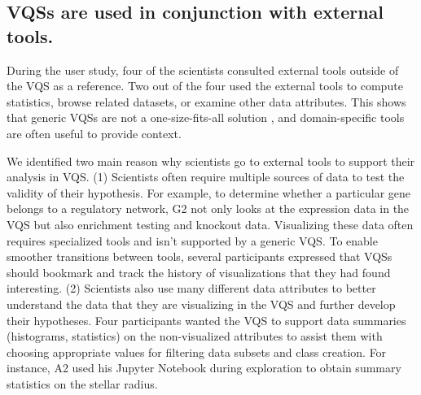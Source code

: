 \subsection{VQSs are used in conjunction with external tools.}
\par During the user study, four of the scientists consulted external tools outside of the VQS as a reference. Two out of the four used the external tools to compute statistics, browse related datasets, or examine other data attributes. This shows that generic VQSs are not a one-size-fits-all solution%
, and domain-specific tools are often useful to provide context.
\par We identified two main reason why scientists go to external tools to support their analysis in VQS. (1) Scientists often require multiple sources of data to test the validity of their hypothesis. For example, to determine whether a particular gene belongs to a regulatory network, G2 not only looks at the expression data in the VQS but also enrichment testing and knockout data. Visualizing these data often requires specialized tools and isn't  supported by a generic VQS. To enable smoother transitions between tools, several participants expressed that VQSs should bookmark and track the history of visualizations that they had found interesting. (2) Scientists also use many different data attributes to better understand the data that they are visualizing in the VQS and further develop their hypotheses. Four participants wanted the VQS to support data summaries (histograms, statistics) on the non-visualized attributes to assist them with choosing appropriate values for filtering data subsets and class creation. For instance, A2 used his Jupyter Notebook during exploration to obtain summary statistics on the stellar radius. 
